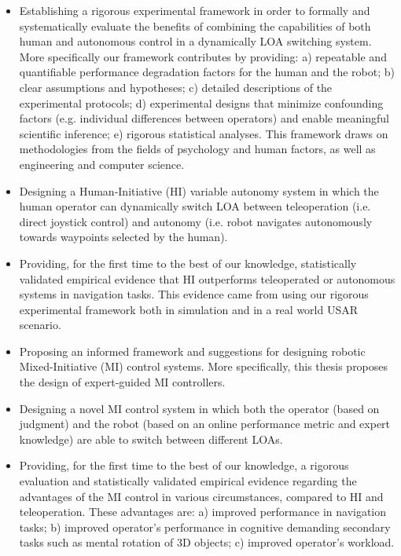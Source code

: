 \documentclass[a4paper,12pt,oneside,openright]{bhamthesis}
\begin{document}
\begin{itemize}

	\item Establishing a rigorous experimental framework in order to formally and systematically evaluate the benefits of combining the capabilities of both human and autonomous control in a dynamically LOA switching system. More specifically our framework contributes by providing: a) repeatable and quantifiable performance degradation factors for the human and the robot; b) clear assumptions and hypotheses; c) detailed descriptions of the experimental protocols; d) experimental designs that minimize confounding factors (e.g. individual differences between operators) and enable meaningful scientific inference; e) rigorous statistical analyses. This framework draws on methodologies from the fields of psychology and human factors, as well as engineering and computer science. 
	
	\item Designing a Human-Initiative (HI) variable autonomy system in which the human operator can dynamically switch LOA between teleoperation (i.e. direct joystick control) and autonomy (i.e. robot navigates autonomously towards waypoints selected by the human).
	
	\item Providing, for the first time to the best of our knowledge, statistically validated empirical evidence that HI outperforms teleoperated or autonomous systems in navigation tasks. This evidence came from using our rigorous experimental framework both in simulation and in a real world USAR scenario.
    
    \item Proposing an informed framework and suggestions for designing robotic Mixed-Initiative (MI) control systems. More specifically, this thesis proposes the design of expert-guided MI controllers.
    
	\item Designing a novel MI control system in which both the operator (based on judgment) and the robot (based on an online performance metric and expert knowledge) are able to switch between different LOAs.
	
	\item Providing, for the first time to the best of our knowledge, a rigorous evaluation and statistically validated empirical evidence regarding the advantages of the MI control in various circumstances, compared to HI and teleoperation. These advantages are: a) improved performance in navigation tasks; b) improved operator's performance in cognitive demanding secondary tasks such as mental rotation of 3D objects; c) improved operator's workload.
	

\end{itemize}
\end{document}
